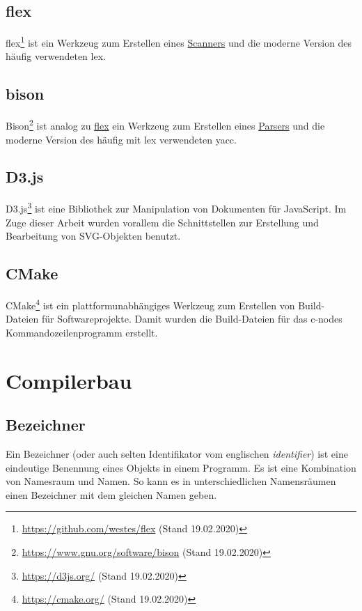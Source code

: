 \documentclass[oneside]{ausarbeitung}
\begin{document}
\subsection{flex}
\label{sub:flex}
flex\footnote{\url{https://github.com/westes/flex} (Stand 19.02.2020)} ist ein Werkzeug zum Erstellen eines \hyperref[sub:scanner]{Scanners} und die moderne Version des häufig verwendeten lex.

\subsection{bison}
\label{sub:bison}
Bison\footnote{\url{https://www.gnu.org/software/bison} (Stand 19.02.2020)} ist analog zu \hyperref[sub:flex]{flex} ein Werkzeug zum Erstellen eines \hyperref[sub:parser]{Parsers} und die moderne Version des häufig mit lex verwendeten yacc.

\subsection{D3.js}
\label{sub:d3js}
D3.js\footnote{\url{https://d3js.org/} (Stand 19.02.2020)} ist eine Bibliothek zur Manipulation von Dokumenten für JavaScript. Im Zuge dieser Arbeit wurden vorallem die Schnittstellen zur Erstellung und Bearbeitung von SVG-Objekten benutzt.

\subsection{CMake}
\label{sub:cmake}
CMake\footnote{\url{https://cmake.org/} (Stand 19.02.2020)} ist ein plattformunabhängiges Werkzeug zum Erstellen von Build-Dateien für Softwareprojekte. Damit wurden die Build-Dateien für das c-nodes Kommandozeilenprogramm erstellt.

\section{Compilerbau}
\label{sec:compiler_theory}
\subsection{Bezeichner}
\label{sub:identifier}
Ein Bezeichner (oder auch selten Identifikator vom englischen \textit{identifier}) ist eine eindeutige Benennung eines Objekts in einem Programm. Es ist eine Kombination von Namesraum und Namen. So kann es in unterschiedlichen Namensräumen einen Bezeichner mit dem gleichen Namen geben.
\end{document}

